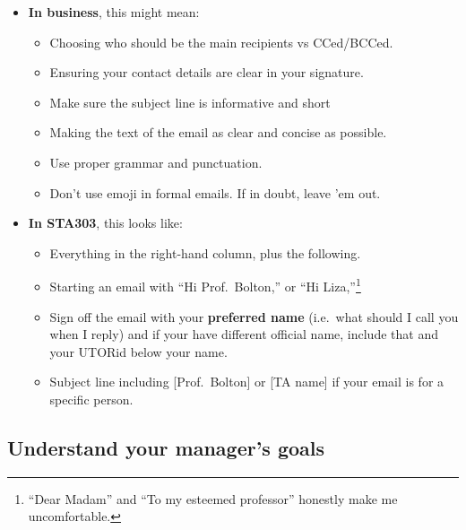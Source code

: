 \documentclass[
  openany]{book}
\providecommand{\tightlist}{%
  \setlength{\itemsep}{0pt}\setlength{\parskip}{0pt}}
\begin{document}
\begin{itemize}
\tightlist
\item
  \textbf{In business}, this might mean:

  \begin{itemize}
  \tightlist
  \item
    Choosing who should be the main recipients vs CCed/BCCed.
  \item
    Ensuring your contact details are clear in your signature.
  \item
    Make sure the subject line is informative and short
  \item
    Making the text of the email as clear and concise as possible.
  \item
    Use proper grammar and punctuation.
  \item
    Don't use emoji in formal emails. If in doubt, leave 'em out.
  \end{itemize}
\item
  \textbf{In STA303}, this looks like:

  \begin{itemize}
  \tightlist
  \item
    Everything in the right-hand column, plus the following.
  \item
    Starting an email with ``Hi Prof.~Bolton,'' or ``Hi Liza,''\footnote{``Dear Madam'' and ``To my esteemed professor'' honestly make me uncomfortable.}
  \item
    Sign off the email with your \textbf{preferred name} (i.e.~what should I call you when I reply) and if your have different official name, include that and your UTORid below your name.
  \item
    Subject line including {[}Prof.~Bolton{]} or {[}TA name{]} if your email is for a specific person.
  \end{itemize}
\end{itemize}

\hypertarget{understand-your-managers-goals}{%
\subsection{Understand your manager's goals}\label{understand-your-managers-goals}}
\end{document}
